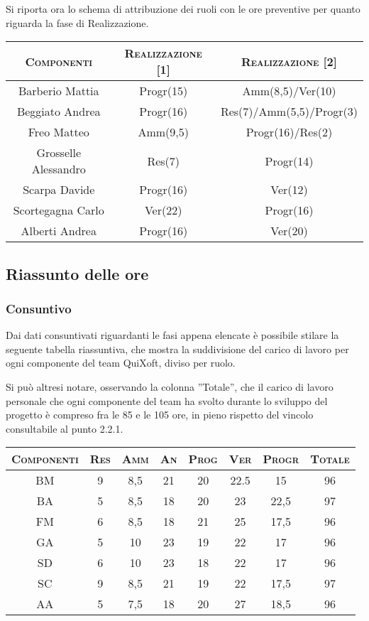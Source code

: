 \documentclass[11pt,a4paper]{article}
\begin{document}
Si riporta ora lo schema di attribuzione dei ruoli con le ore preventive per quanto riguarda la fase di Realizzazione.
\\
\begin{center}
\begin{tabular}{|c||c|c|}
\hline
\textsc{Componenti} & \textsc{Realizzazione [1]} & \textsc{Realizzazione [2]} \\ \hline \hline
Barberio Mattia & Progr(15) & Amm(8,5)/Ver(10) \\ \hline
Beggiato Andrea & Progr(16) & Res(7)/Amm(5,5)/Progr(3) \\ \hline
Freo Matteo & Amm(9,5) & Progr(16)/Res(2) \\ \hline
Grosselle Alessandro & Res(7) & Progr(14) \\ \hline
Scarpa Davide & Progr(16) & Ver(12) \\ \hline
Scortegagna Carlo & Ver(22) & Progr(16) \\ \hline
Alberti Andrea & Progr(16) & Ver(20) \\ \hline
\end{tabular}
\end{center}
\bigskip
\subsection{Riassunto delle ore}
\bigskip
\subsubsection{Consuntivo}
Dai dati consuntivati riguardanti le fasi appena elencate è possibile stilare la seguente tabella riassuntiva, che mostra la suddivisione del carico di lavoro per ogni componente del team QuiXoft, diviso per ruolo.

Si può altresi notare, osservando la colonna ''Totale'', che il carico di lavoro personale che ogni componente del team ha svolto durante lo sviluppo del progetto è compreso fra le 85 e le 105 ore, in pieno rispetto del vincolo consultabile al punto 2.2.1.
\\
\begin{center}
\begin{tabular}{|c||c|c|c|c|c|c||c|}
\hline
\textsc{Componenti} & \textsc{Res} & \textsc{Amm} & \textsc{An} & \textsc{Prog} & \textsc{Ver} & \textsc{Progr} & \textsc{Totale}\\
\hline \hline
BM & 9 & 8,5 & 21 & 20 & 22.5 & 15 & 96 \\ \hline
BA & 5 & 8,5 & 18 & 20 & 23 & 22,5 & 97 \\ \hline
FM & 6 & 8,5 & 18 & 21 & 25 & 17,5 & 96 \\ \hline
GA & 5 & 10 & 23 & 19 & 22 & 17 & 96 \\ \hline
SD & 6 & 10 & 23 & 18 & 22 & 17 & 96 \\ \hline
SC & 9 & 8,5 & 21 & 19 & 22 & 17,5 & 97 \\ \hline
AA & 5 & 7,5 & 18 & 20 & 27 & 18,5 & 96 \\ \hline
\end{tabular}
\end{center}
\end{document}
